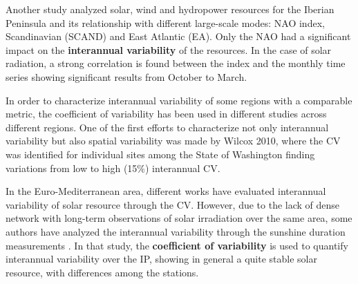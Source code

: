 Another study analyzed solar, wind and hydropower resources for the Iberian Peninsula and its relationship with different large-scale modes: NAO index, Scandinavian (SCAND) and East Atlantic (EA). Only the NAO had a significant impact on the \textbf{interannual variability} of the resources. In the case of solar radiation, a strong correlation is found between the index and the monthly time series \cite*{Jerez2013a} showing significant results from October to March.

In order to characterize interannual variability of some regions with a comparable metric, the coefficient of variability has been used in different studies across different regions. One of the first efforts to characterize not only interannual variability but also spatial variability was made by Wilcox 2010, where the CV was identified for individual sites among the State of Washington finding variations from low to high (15$\%$) interannual CV.


In the Euro-Mediterranean area, different works have evaluated interannual variability of solar resource through the CV. However, due to the lack of dense network with long-term observations of solar irradiation over the same area, some authors have analyzed the interannual variability through the sunshine duration measurements \cite*{Gil2015}. In that study, the \textbf{coefficient of variability} is used to quantify interannual variability over the IP, showing in general a quite stable solar resource, with differences among the stations. %




 

